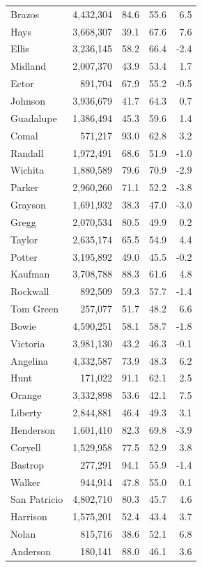 \documentclass[11pt]{article}
\begin{document}
\begin{longtable}{lrrrr}
Brazos & 4,432,304 & 84.6 & 55.6 & 6.5 \\
Hays & 3,668,307 & 39.1 & 67.6 & 7.6 \\
Ellis & 3,236,145 & 58.2 & 66.4 & -2.4 \\
Midland & 2,007,370 & 43.9 & 53.4 & 1.7 \\
Ector & 891,704 & 67.9 & 55.2 & -0.5 \\
Johnson & 3,936,679 & 41.7 & 64.3 & 0.7 \\
Guadalupe & 1,386,494 & 45.3 & 59.6 & 1.4 \\
Comal & 571,217 & 93.0 & 62.8 & 3.2 \\
Randall & 1,972,491 & 68.6 & 51.9 & -1.0 \\
Wichita & 1,880,589 & 79.6 & 70.9 & -2.9 \\
Parker & 2,960,260 & 71.1 & 52.2 & -3.8 \\
Grayson & 1,691,932 & 38.3 & 47.0 & -3.0 \\
Gregg & 2,070,534 & 80.5 & 49.9 & 0.2 \\
Taylor & 2,635,174 & 65.5 & 54.9 & 4.4 \\
Potter & 3,195,892 & 49.0 & 45.5 & -0.2 \\
Kaufman & 3,708,788 & 88.3 & 61.6 & 4.8 \\
Rockwall & 892,509 & 59.3 & 57.7 & -1.4 \\
Tom Green & 257,077 & 51.7 & 48.2 & 6.6 \\
Bowie & 4,590,251 & 58.1 & 58.7 & -1.8 \\
Victoria & 3,981,130 & 43.2 & 46.3 & -0.1 \\
Angelina & 4,332,587 & 73.9 & 48.3 & 6.2 \\
Hunt & 171,022 & 91.1 & 62.1 & 2.5 \\
Orange & 3,332,898 & 53.6 & 42.1 & 7.5 \\
Liberty & 2,844,881 & 46.4 & 49.3 & 3.1 \\
Henderson & 1,601,410 & 82.3 & 69.8 & -3.9 \\
Coryell & 1,529,958 & 77.5 & 52.9 & 3.8 \\
Bastrop & 277,291 & 94.1 & 55.9 & -1.4 \\
Walker & 944,914 & 47.8 & 55.0 & 0.1 \\
San Patricio & 4,802,710 & 80.3 & 45.7 & 4.6 \\
Harrison & 1,575,201 & 52.4 & 43.4 & 3.7 \\
Nolan & 815,716 & 38.6 & 52.1 & 6.8 \\
Anderson & 180,141 & 88.0 & 46.1 & 3.6 \\

\end{longtable}
\end{document}
